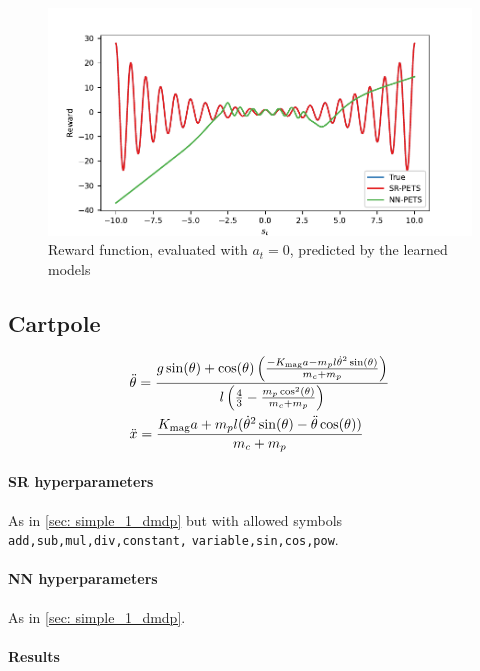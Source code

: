 \documentclass[11pt]{article}
\begin{document}
\begin{figure}
	\centering
	\includegraphics{simple1dmdp_pets.pdf}
	\caption{Reward function, evaluated with $a_t=0$, predicted by the learned models}
	\label{fig: simple_1dmdp}
\end{figure}

\subsection{Cartpole}

\begin{align}
	&\ddot{\theta} = \frac{g\sin(\theta) + \cos(\theta)\left(\frac{-K_{\rm mag} a - m_p l \dot{\theta}^2\sin(\theta)}{m_c + m_p}\right)}{l\left(\frac{4}{3} - \frac{m_p\cos^2(\theta)}{m_c+m_p}\right)}\\
	& \ddot{x} = \frac{K_{\rm mag} a + m_pl(\dot{\theta}^2\sin(\theta) - \ddot{\theta}\cos(\theta))}{m_c + m_p}
\end{align}


\paragraph{SR hyperparameters} As in \ref{sec: simple_1_dmdp} but with allowed symbols \texttt{add,sub,mul,div,constant,} \texttt{variable,sin,cos,pow}.

\paragraph{NN hyperparameters} As in \ref{sec: simple_1_dmdp}.

\paragraph{Results}
\end{document}
